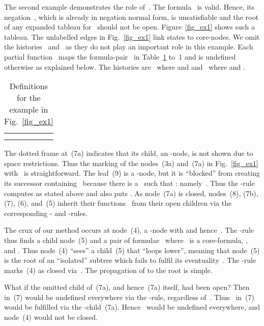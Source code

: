 \documentclass{entcs}
\newcommand{\trid}{}
\newcommand{\trero}{}
\newcommand{\trea}{}
\begin{document}
\begin{center}
The second example demonstrates the role of~.
The formula~ is valid.
Hence, its negation~,
which is already in negation normal form, is unsatisfiable
and the root of any expanded tableau for~ should not be open.
Figure~\ref{fig_ex1} shows such a tableau.
The unlabelled edges in Fig.~\ref{fig_ex1} link states to core-nodes.
We omit the histories~ and~ 
as they do not play an important role in this example.
Each partial function~ maps the formula-pair~
in Table~\ref{tab_uev} to~1
and is undefined otherwise as explained below.
The histories are~
where  and 
and~ where  and .
\begin{table}[t]
  \caption{Definitions for the example in Fig.~\ref{fig_ex1}}
  \label{tab_uev}
  \begin{center}
    \begin{tabular}{|c|c|c|c|c|}
      \hline
       &  &  &  &  
      \\ \hline
       
      &  
      &  
      &  
      &  
      \\ \hline
      
      &  &  &  & 
      \\ \hline
    \end{tabular}
  \end{center}
\end{table}

The dotted frame at~(7a) indicates
that its child, an \trid{}-node,
is not shown due to space restrictions.
Thus the marking of the nodes~(3a) and~(7a) in Fig.~\ref{fig_ex1} with~ is straightforward.
The leaf~(9) is a \trea{}-node,
but it is ``blocked'' from creating its successor containing~
because there is a~
such that : namely~.
Thus the \trea{}-rule computes  as stated above
and also puts .
As node~(7a) is closed,
nodes~(8), (7b), (7), (6), and~(5)
inherit their functions~ from their open children
via the corresponding - and -rules.

The crux of our method occurs at node~(4),
a \trea{}-node with  and hence~.
The \trea{}-rule thus finds a child node~(5)
and a pair of formulae~
where~ is a core-formula, ,
and .
Thus node~(4) ``sees'' a child~(5) that ``loops lower'',
meaning that node~(5) is the root of an ``isolated'' subtree
which fails to fulfil its eventuality~.
The \trea{}-rule marks~(4) as closed via~.
The propagation of  to the root is simple.

What if the omitted child of~(7a), and hence~(7a) itself, had been open?
Then~ in~(7) would be undefined everywhere via the
\trero{}-rule, regardless of~.
Thus~ in~(7) would be fulfilled via the -child~(7a).
Hence~ would be undefined everywhere,
and node~(4) would not be closed.
\begin{figure}
  \begin{center}
    

\end{center}
\end{figure}
\end{center}
\end{document}
